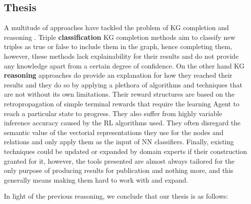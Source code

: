 
\subsection{Thesis}


A multitude of approaches have tackled the problem of KG completion \cite{} and reasoning \cite{}. Triple \textbf{classification} KG completion methods aim to classify new triples as true or false to include them in the graph, hence completing them, however, these methods lack explainability for their results and do not provide any knowledge apart from a certain degree of confidence.
On the other hand KG \textbf{reasoning} approaches do provide an explanation for how they reached their results and they do so by applying a plethora of algorithms and techniques that are not without its own limitations. Their reward structures are based on the retropropagation of simple terminal rewards that require the learning Agent to reach a particular state to progress. They also suffer from highly variable inference accuracy caused by the RL algorithms used. They often disregard the semantic value of the vectorial representations they use for the nodes and relations and only apply them as the input of NN classifiers. Finally, existing techniques could be updated or expanded by domain experts if their construction granted for it, however, the tools presented are almost always tailored for the only purpose of producing results for publication and nothing more, and this generally means making them hard to work with and expand.

In light of the previous reasoning, we conclude that our thesis is as follows:


